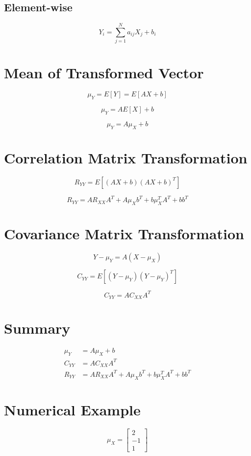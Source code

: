 \documentclass{article}
\begin{document}
\subsection{Element-wise}
\[
Y_i = \sum_{j=1}^{N} a_{ij} X_j + b_i
\]

\section{Mean of Transformed Vector}

\[
\mu_Y = E[Y] = E[AX + b]
\]

\[
\mu_Y = AE[X] + b
\]

\[
\boxed{\mu_Y = A\mu_X + b}
\]

\section{Correlation Matrix Transformation}

\[
R_{YY} = E[(AX + b)(AX + b)^T]
\]

\[
R_{YY} = A R_{XX} A^T + A\mu_X b^T + b\mu_X^T A^T + bb^T
\]

\section{Covariance Matrix Transformation}

\[
Y - \mu_Y = A(X - \mu_X)
\]

\[
C_{YY} = E[(Y - \mu_Y)(Y - \mu_Y)^T]
\]

\[
\boxed{C_{YY} = A C_{XX} A^T}
\]

\section{Summary}

\begin{align*}
\mu_Y &= A\mu_X + b \\
C_{YY} &= A C_{XX} A^T \\
R_{YY} &= A R_{XX} A^T + A\mu_X b^T + b\mu_X^T A^T + bb^T
\end{align*}

\section{Numerical Example}

\[
\mu_X =
\begin{bmatrix}
2 \\ -1 \\ 1
\end{bmatrix}
\]
\end{document}
